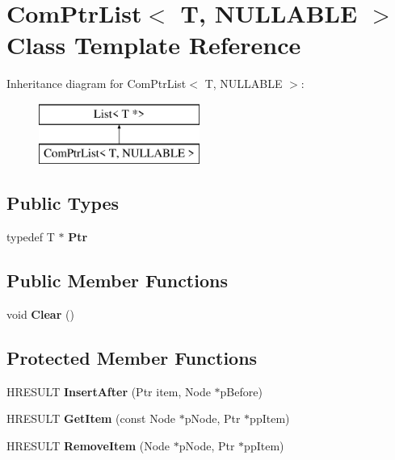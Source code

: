 \hypertarget{class_com_ptr_list}{}\section{Com\+Ptr\+List$<$ T, N\+U\+L\+L\+A\+B\+LE $>$ Class Template Reference}
\label{class_com_ptr_list}
Inheritance diagram for Com\+Ptr\+List$<$ T, N\+U\+L\+L\+A\+B\+LE $>$\+:\begin{figure}[H]
\begin{center}
\leavevmode
\includegraphics[height=2.000000cm]{d5/ddb/class_com_ptr_list}
\end{center}
\end{figure}
\subsection*{Public Types}
\begin{DoxyCompactItemize}
\item 
\mbox{\label{class_com_ptr_list_ab5dc829563a692cf2777b83b8ab3e04c}} 
typedef T $\ast$ {\bfseries Ptr}
\end{DoxyCompactItemize}
\subsection*{Public Member Functions}
\begin{DoxyCompactItemize}
\item 
\mbox{\label{class_com_ptr_list_ad14c61548bd4ed779b26449e1671bd02}} 
void {\bfseries Clear} ()
\end{DoxyCompactItemize}
\subsection*{Protected Member Functions}
\begin{DoxyCompactItemize}
\item 
\mbox{\label{class_com_ptr_list_acfdc082599bd84d7c150f47ccd58ce9c}} 
H\+R\+E\+S\+U\+LT {\bfseries Insert\+After} (Ptr item, Node $\ast$p\+Before)
\item 
\mbox{\label{class_com_ptr_list_a19f36d5279561aef98dc82afa2a14c01}} 
H\+R\+E\+S\+U\+LT {\bfseries Get\+Item} (const Node $\ast$p\+Node, Ptr $\ast$pp\+Item)
\item 
\mbox{\label{class_com_ptr_list_a9fe6f6957f509873bb780190520295a3}} 
H\+R\+E\+S\+U\+LT {\bfseries Remove\+Item} (Node $\ast$p\+Node, Ptr $\ast$pp\+Item)
\end{DoxyCompactItemize}
